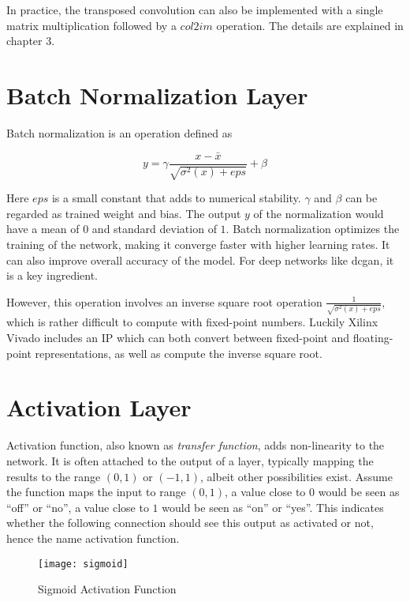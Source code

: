 In practice, the transposed convolution can also be implemented with a single matrix multiplication
followed by a $col2im$ operation. The details are explained in chapter 3.

\section{Batch Normalization Layer}

Batch normalization is an operation defined as

\begin{equation} \label{eq:batch_normalization}
  y = \gamma \frac{x - \bar{x}}{\sqrt{\sigma^2(x) + {eps}}} + \beta
\end{equation}

Here $eps$ is a small constant that adds to numerical stability. $\gamma$ and $\beta$ can be regarded
as trained weight and bias. The output $y$ of the normalization would have a mean of $0$ and standard
deviation of $1$. Batch normalization optimizes the training of the network, making it converge
faster with higher learning rates. It can also improve overall accuracy of the model. For deep networks
like \gls{dcgan}, it is a key ingredient.

However, this operation involves an inverse square root operation $\frac{1}{\sqrt{\sigma^2(x) + eps}}$,
which is rather difficult to compute with fixed-point numbers. Luckily Xilinx Vivado includes an IP which
can both convert between fixed-point and floating-point representations, as well as compute the inverse square
root.

\section{Activation Layer}

Activation function, also known as \textit{transfer function}, adds non-linearity to the network. It is often
attached to the output of a layer, typically mapping the results to the range $(0, 1)$ or $(-1, 1)$, albeit
other possibilities exist. Assume the function maps the input to range $(0, 1)$, a value close to $0$ would
be seen as ``off'' or ``no'', a value close to $1$ would be seen as ``on'' or ``yes''. This indicates whether the
following connection should see this output as activated or not, hence the name activation function.

\begin{figure}[h]
  \centering
  \texttt{[image: sigmoid]}
  \caption{Sigmoid Activation Function}
  \label{fig:sigmoid}
\end{figure}

